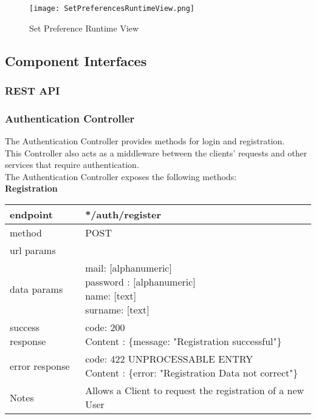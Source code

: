 \begin{figure}[H]
	\centering
	\texttt{[image: SetPreferencesRuntimeView.png]}
	\caption{Set Preference Runtime View}
\end{figure}

\subsection{Component Interfaces}

\subsubsection{REST API}
\subsubsection*{Authentication Controller}
The Authentication Controller provides methods for login and registration.\\ This Controller also acts as a middleware between the clients' requests and other services that require authentication.\\
The Authentication Controller exposes the following methods:\\

\textbf{Registration}

\begin{tabularx}{\linewidth}{| l | l |}
	\hline
	endpoint & */auth/register \\
	\hline
	method & POST \\
	\hline
	url params & \\
	\hline
	data params &
	\parbox{0.7\textwidth}{
		\bigskip
		mail: [alphanumeric]\\
		password : [alphanumeric]\\
		name: [text]\\
		surname: [text]
		\bigskip
	} \\
	\hline
	success response &
	\parbox{0.7\textwidth}{
		\bigskip
		code: 200\\
		Content : \{message: "Registration successful"\}
		\bigskip
	} \\
	\hline
	error response &
	\parbox{0.7\textwidth}{
		\bigskip
		code: 422 UNPROCESSABLE ENTRY \\
		Content : \{error: "Registration Data not correct"\}
		\bigskip
	} \\
	\hline
	Notes & 
	\parbox{0.7\textwidth}{
		\bigskip Allows a Client to request the registration of a new User
	\bigskip}  \\
	\hline
\end{tabularx}

